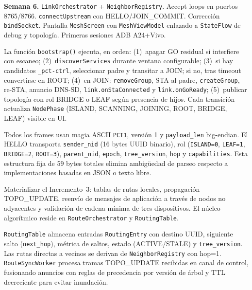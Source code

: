 \textbf{Semana 6.} \texttt{LinkOrchestrator} + \texttt{NeighborRegistry}. Accept loops en puertos 8765/8766. \texttt{connectUpstream} con HELLO/JOIN\_COMMIT. Corrección \texttt{bindSocket}. Pantalla \texttt{MeshScreen} con \texttt{MeshViewModel} enlazado a \texttt{StateFlow} de debug y topología. Primeras sesiones ADB A24+Vivo.


La función \texttt{bootstrap()} ejecuta, en orden: (1)~apagar GO residual si interfiere con escaneo; (2)~\texttt{discoverServices} durante ventana configurable; (3)~si hay candidatos \texttt{\_pct-ctrl}, seleccionar padre y transitar a JOIN; si no, tras timeout convertirse en ROOT; (4)~en JOIN: \texttt{removeGroup}, STA al padre, \texttt{createGroup}, re-STA, anuncio DNS-SD, \texttt{link.onStaConnected} y \texttt{link.onGoReady}; (5)~publicar topología con rol BRIDGE o LEAF según presencia de hijos. Cada transición actualiza \texttt{NodePhase} (ISLAND, SCANNING, JOINING, ROOT, BRIDGE, LEAF) visible en UI.


Todos los frames usan magia ASCII \texttt{PCT1}, versión 1 y \texttt{payload\_len} big-endian. El HELLO transporta \texttt{sender\_nid} (16 bytes UUID binario), rol (\texttt{ISLAND=0}, \texttt{LEAF=1}, \texttt{BRIDGE=2}, \texttt{ROOT=3}), \texttt{parent\_nid}, \texttt{epoch}, \texttt{tree\_version}, \texttt{hop} y \texttt{capabilities}. Esta estructura fija de 59 bytes totales elimina ambigüedad de parseo respecto a implementaciones basadas en JSON o texto libre.



Materializar el Incremento~3: tablas de rutas locales, propagación TOPO\_UPDATE, reenvío de mensajes de aplicación a través de nodos no adyacentes y validación de cadena mínima de tres dispositivos. El núcleo algorítmico reside en \texttt{RouteOrchestrator} y \texttt{RoutingTable}.


\texttt{RoutingTable} almacena entradas \texttt{RoutingEntry} con destino UUID, siguiente salto (\texttt{next\_hop}), métrica de saltos, estado (ACTIVE/STALE) y \texttt{tree\_version}. Las rutas directas a vecinos se derivan de \texttt{NeighborRegistry} con hop=1. \texttt{RouteSyncWorker} procesa tramas TOPO\_UPDATE recibidas en canal de control, fusionando anuncios con reglas de precedencia por versión de árbol y TTL decreciente para evitar inundación.

